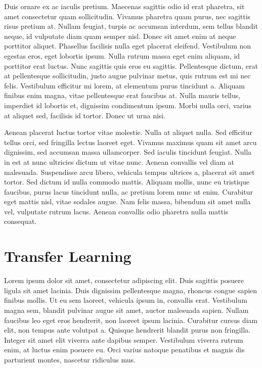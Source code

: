 \documentclass[
  letterpaper,
  DIV=11,
  numbers=noendperiod]{scrreprt}
\begin{document}
Duis ornare ex ac iaculis pretium. Maecenas sagittis odio id erat
pharetra, sit amet consectetur quam sollicitudin. Vivamus pharetra quam
purus, nec sagittis risus pretium at. Nullam feugiat, turpis ac accumsan
interdum, sem tellus blandit neque, id vulputate diam quam semper nisl.
Donec sit amet enim at neque porttitor aliquet. Phasellus facilisis
nulla eget placerat eleifend. Vestibulum non egestas eros, eget lobortis
ipsum. Nulla rutrum massa eget enim aliquam, id porttitor erat luctus.
Nunc sagittis quis eros eu sagittis. Pellentesque dictum, erat at
pellentesque sollicitudin, justo augue pulvinar metus, quis rutrum est
mi nec felis. Vestibulum efficitur mi lorem, at elementum purus
tincidunt a. Aliquam finibus enim magna, vitae pellentesque erat
faucibus at. Nulla mauris tellus, imperdiet id lobortis et, dignissim
condimentum ipsum. Morbi nulla orci, varius at aliquet sed, facilisis id
tortor. Donec ut urna nisi.

Aenean placerat luctus tortor vitae molestie. Nulla at aliquet nulla.
Sed efficitur tellus orci, sed fringilla lectus laoreet eget. Vivamus
maximus quam sit amet arcu dignissim, sed accumsan massa ullamcorper.
Sed iaculis tincidunt feugiat. Nulla in est at nunc ultricies dictum ut
vitae nunc. Aenean convallis vel diam at malesuada. Suspendisse arcu
libero, vehicula tempus ultrices a, placerat sit amet tortor. Sed dictum
id nulla commodo mattis. Aliquam mollis, nunc eu tristique faucibus,
purus lacus tincidunt nulla, ac pretium lorem nunc ut enim. Curabitur
eget mattis nisl, vitae sodales augue. Nam felis massa, bibendum sit
amet nulla vel, vulputate rutrum lacus. Aenean convallis odio pharetra
nulla mattis consequat.

\chapter{Transfer Learning}\label{transfer-learning}

Lorem ipsum dolor sit amet, consectetur adipiscing elit. Duis sagittis
posuere ligula sit amet lacinia. Duis dignissim pellentesque magna,
rhoncus congue sapien finibus mollis. Ut eu sem laoreet, vehicula ipsum
in, convallis erat. Vestibulum magna sem, blandit pulvinar augue sit
amet, auctor malesuada sapien. Nullam faucibus leo eget eros hendrerit,
non laoreet ipsum lacinia. Curabitur cursus diam elit, non tempus ante
volutpat a. Quisque hendrerit blandit purus non fringilla. Integer sit
amet elit viverra ante dapibus semper. Vestibulum viverra rutrum enim,
at luctus enim posuere eu. Orci varius natoque penatibus et magnis dis
parturient montes, nascetur ridiculus mus.
\end{document}
